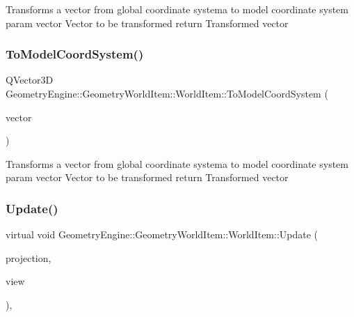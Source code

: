 Transforms a vector from global coordinate systema to model coordinate system param vector Vector to be transformed return Transformed vector \mbox{\label{class_geometry_engine_1_1_geometry_world_item_1_1_world_item_a8391874ad6063fe8b09d7e6978dd0f20}} 
\subsubsection{\texorpdfstring{ToModelCoordSystem()}{ToModelCoordSystem()}}
{\footnotesize\ttfamily Q\+Vector3D Geometry\+Engine\+::\+Geometry\+World\+Item\+::\+World\+Item\+::\+To\+Model\+Coord\+System (\begin{DoxyParamCaption}\item[{const Q\+Vector3D \&}]{vector }\end{DoxyParamCaption})\hspace{0.3cm}{\ttfamily [virtual]}}

Transforms a vector from global coordinate systema to model coordinate system param vector Vector to be transformed return Transformed vector \mbox{\label{class_geometry_engine_1_1_geometry_world_item_1_1_world_item_aa6e82e5d95ae34d0addb991cd84aca6f}} 
\subsubsection{\texorpdfstring{Update()}{Update()}}
{\footnotesize\ttfamily virtual void Geometry\+Engine\+::\+Geometry\+World\+Item\+::\+World\+Item\+::\+Update (\begin{DoxyParamCaption}\item[{const Q\+Matrix4x4 \&}]{projection,  }\item[{const Q\+Matrix4x4 \&}]{view }\end{DoxyParamCaption})\hspace{0.3cm}{\ttfamily [inline]}, {\ttfamily [virtual]}}

